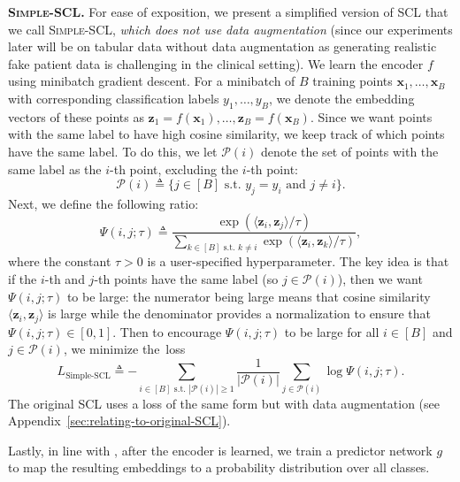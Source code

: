 \documentclass[pmlr,twocolumn,10pt]{jmlr} %
\begin{document}
\vspace{.4em}
\noindent
\textbf{\bfseries\scshape Simple-SCL.}
For ease of exposition, we present a simplified version of SCL that we call \textsc{Simple-SCL}, \emph{which does not use data augmentation} (since our experiments later will be on tabular data without data augmentation as generating realistic fake patient data is challenging in the clinical setting).
We learn the encoder $f$ using minibatch gradient descent. For a minibatch of $B$ training points $\mathbf{x}_1,\dots,\mathbf{x}_B$ with corresponding classification labels $y_1,\dots,y_B$, we denote the embedding vectors of these points as $\mathbf{z}_1=f(\mathbf{x}_1),\dots,\mathbf{z}_B=f(\mathbf{x}_B)$. Since we want points with the same label to have high cosine similarity, we keep track of which points have the same label. To do this, we let $\mathcal{P}(i)$ denote the set of points with the same label as the $i$-th point, excluding the $i$-th point:
\begin{equation}
\mathcal{P}(i) \triangleq  \{ j\in[B]\text{ s.t.~}y_j=y_i\text{ and }j\ne i \}.
\label{eq:neighbors-of-i}
\end{equation}
Next, we define the following ratio:
\begin{equation}
\Psi(i,j;\tau)
\triangleq  \frac{\exp(\langle \mathbf{z}_i, \mathbf{z}_j \rangle / \tau)}{\sum_{k\in[B]\text{ s.t.~}k\ne i}\exp(\langle \mathbf{z}_i, \mathbf{z}_k \rangle / \tau)},
\label{eq:Psi}
\end{equation}
where the constant $\tau>0$ is a user-specified hyperparameter. 
The key idea is that if the $i$-th and $j$-th points have the same label (so $j\in\mathcal{P}(i)$), then we want $\Psi(i,j;\tau)$ to be large: the numerator being large means that cosine similarity $\langle\mathbf{z}_i, \mathbf{z}_j\rangle$ is large while the denominator provides a normalization to ensure that $\Psi(i,j;\tau)\in[0,1]$. Then to encourage $\Psi(i,j;\tau)$ to be large for all $i\in[B]$ and $j\in\mathcal{P}(i)$, we minimize the~loss
\begin{equation}
L_{\text{Simple-SCL}}
\triangleq 
-\!\!\!\!\!\!\!\!\!\!\!\!\!\!\!\sum_{i\in[B]\text{ s.t.~}|\mathcal{P}(i)|\ge1}
   \frac{1}{|\mathcal{P}(i)|}
     \sum_{j\in\mathcal{P}(i)} \log\Psi(i,j;\tau).
\label{eq:sup-con-loss}
\end{equation}
The original SCL uses a loss of the same form but with data augmentation (see Appendix~\ref{sec:relating-to-original-SCL}).

Lastly, in line with \cite{khosla2020supervised}, after the encoder is learned, we train a predictor network $g$ to map the resulting embeddings to a probability distribution over all classes.
\end{document}
